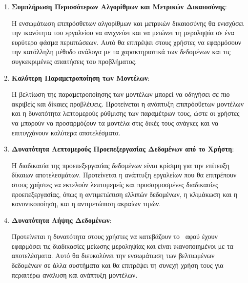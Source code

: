 \documentclass[12pt,twoside]{article}
\newcommand{\en}{\selectlanguage{english}}
\newcommand{\gr}{\selectlanguage{greek}}
\begin{document}
\begin{enumerate}
    \item \textbf{Συμπλήρωση Περισσότερων Αλγορίθμων και Μετρικών Δικαιοσύνης}:
    
    Η ενσωμάτωση επιπρόσθετων αλγορίθμων και μετρικών δικαιοσύνης θα ενισχύσει την ικανότητα του εργαλείου να ανιχνεύει και να μειώνει τη μεροληψία σε ένα ευρύτερο φάσμα περιπτώσεων. Αυτό θα επιτρέψει στους χρήστες να εφαρμόσουν την κατάλληλη μέθοδο ανάλογα με τα χαρακτηριστικά των δεδομένων και τις συγκεκριμένες απαιτήσεις του προβλήματος.
    
    \item \textbf{Καλύτερη Παραμετροποίηση των Μοντέλων}:
    
    Η βελτίωση της παραμετροποίησης των μοντέλων μπορεί να οδηγήσει σε πιο ακριβείς και δίκαιες προβλέψεις. Προτείνεται η ανάπτυξη επιπρόσθετων μοντέλων και η δυνατότητα λεπτομερούς ρύθμισης των παραμέτρων τους, ώστε οι χρήστες να μπορούν να προσαρμόζουν τα μοντέλα στις δικές τους ανάγκες και να επιτυγχάνουν καλύτερα αποτελέσματα.
    
    \item \textbf{Δυνατότητα Λεπτομερούς Προεπεξεργασίας Δεδομένων από το Χρήστη}:
    
    Η διαδικασία της προεπεξεργασίας δεδομένων είναι κρίσιμη για την επίτευξη δίκαιων αποτελεσμάτων. Προτείνεται η ανάπτυξη εργαλείων που θα επιτρέπουν στους χρήστες να εκτελούν λεπτομερείς και προσαρμοσμένες διαδικασίες προεπεξεργασίας, όπως η αντιμετώπιση ελλιπών δεδομένων, η κλιμάκωση και η κανονικοποίηση, και η αντιμετώπιση ακραίων τιμών.
    
    \item \textbf{Δυνατότητα Λήψης Δεδομένων}:
    
    Προτείνεται η δυνατότητα στους χρήστες να κατεβάζουν το \en{dataset}\gr\ αφού έχουν εφαρμόσει τις διαδικασίες μείωσης μεροληψίας και είναι ικανοποιημένοι με τα αποτελέσματα. Αυτό θα διευκολύνει την ενσωμάτωση των βελτιωμένων δεδομένων σε άλλα συστήματα και θα επιτρέψει τη συνεχή χρήση τους για περαιτέρω ανάλυση και ανάπτυξη μοντέλων.
\end{enumerate}

\newpage
\gr
\en
\thispagestyle{plain}
\renewcommand{\bibname}{\gr Βιβλιογραφία}

\end{document}
